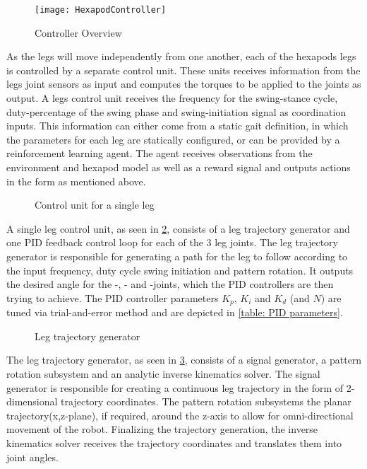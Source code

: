 \begin{figure}
	\centerline{\texttt{[image: HexapodController]}}
	\caption{Controller Overview}
	\label{figure: Controller Overview}
\end{figure}
As the legs will move independently from one another, each of the hexapods legs is controlled by a separate control unit.
These units receives information from the legs joint sensors as input and computes the torques to be applied to the joints as output.
A legs control unit receives the frequency for the swing-stance cycle, duty-percentage of the swing phase and swing-initiation signal as coordination inputs.
This information can either come from a static gait definition, in which the parameters for each leg are statically configured, or can be provided by a reinforcement learning agent.
The agent receives observations from the environment and hexapod model as well as a reward signal and outputs actions in the form as mentioned above.

\begin{figure}
	\centerline{}
	\caption{Control unit for a single leg}
	\label{figure: Leg control unit}
\end{figure}

A single leg control unit, as seen in \ref{figure: Leg control unit}, consists of a leg trajectory generator and one PID feedback control loop for each of the 3 leg joints.
The leg trajectory generator is responsible for generating a path for the leg to follow according to the input frequency, duty cycle swing initiation and pattern rotation.
It outputs the desired angle for the \textalpha-, \textbeta- and \textgamma-joints, which the PID controllers are then trying to achieve.
The PID controller parameters $K_p$, $K_i$ and $K_d$ (and $N$) are tuned via trial-and-error method and are depicted in \ref{table: PID parameters}.

\begin{figure}
	\centerline{}
	\caption{Leg trajectory generator}
	\label{figure: Leg trajectory generator}
\end{figure}

The leg trajectory generator, as seen in \ref{figure: Leg trajectory generator}, consists of a signal generator, a pattern rotation subsystem and an analytic inverse kinematics solver.
The signal generator is responsible for creating a continuous leg trajectory in the form of 2-dimensional trajectory coordinates.
The pattern rotation subsystems the planar trajectory(x,z-plane), if required, around the z-axis to allow for omni-directional movement of the robot.
Finalizing the trajectory generation, the inverse kinematics solver receives the trajectory coordinates and translates them into joint angles.


